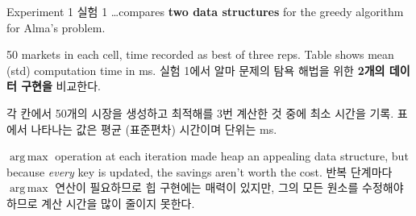\documentclass[11pt,mathserif,notheorems]{beamer}
\theoremstyle{definition}
\theoremstyle{definition}
\DeclareMathOperator*{\argmax}{arg\,max}
\begin{document}
\begin{frame}{\ifen Experiment 1 \else 실험 1 \fi}
\ifen 
\dots compares \textbf{two data structures} for the greedy algorithm for Alma's problem. 
 
50 markets in each cell, time recorded as best of three reps. Table shows mean (std) computation time in ms.
\else
실험 1에서 알마 문제의 탐욕 해법을 위한 \textbf{2개의 데이터 구현을} 비교한다.

각 칸에서 50개의 시장을 생성하고 최적해를 3번 계산한 것 중에 최소 시간을 기록. 표에서 나타나는 값은 평균 (표준편차) 시간이며 단위는 ms.
\fi
\begin{center}
\end{center}
\ifen 
$\argmax$ operation at each iteration made heap an appealing data structure, but because \emph{every} key is updated, the savings aren't worth the cost.
\else 
반복 단계마다 $\argmax$ 연산이 필요하므로 힙 구현에는 매력이 있지만, 그의 모든 원소를 수정해야 하므로 계산 시간을 많이 줄이지 못한다.
\fi

\end{frame}
\end{document}
